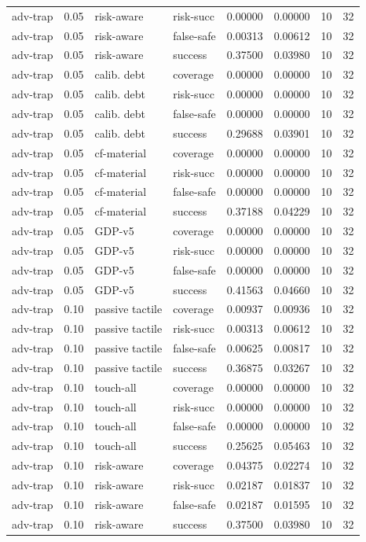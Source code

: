 \documentclass{article}
\begin{document}
\begin{center}
\begin{longtable}{llllllll}
adv-trap & 0.05 & risk-aware & risk-succ & 0.00000 & 0.00000 & 10 & 32 \\
adv-trap & 0.05 & risk-aware & false-safe & 0.00313 & 0.00612 & 10 & 32 \\
adv-trap & 0.05 & risk-aware & success & 0.37500 & 0.03980 & 10 & 32 \\
adv-trap & 0.05 & calib. debt & coverage & 0.00000 & 0.00000 & 10 & 32 \\
adv-trap & 0.05 & calib. debt & risk-succ & 0.00000 & 0.00000 & 10 & 32 \\
adv-trap & 0.05 & calib. debt & false-safe & 0.00000 & 0.00000 & 10 & 32 \\
adv-trap & 0.05 & calib. debt & success & 0.29688 & 0.03901 & 10 & 32 \\
adv-trap & 0.05 & cf-material & coverage & 0.00000 & 0.00000 & 10 & 32 \\
adv-trap & 0.05 & cf-material & risk-succ & 0.00000 & 0.00000 & 10 & 32 \\
adv-trap & 0.05 & cf-material & false-safe & 0.00000 & 0.00000 & 10 & 32 \\
adv-trap & 0.05 & cf-material & success & 0.37188 & 0.04229 & 10 & 32 \\
adv-trap & 0.05 & GDP-v5 & coverage & 0.00000 & 0.00000 & 10 & 32 \\
adv-trap & 0.05 & GDP-v5 & risk-succ & 0.00000 & 0.00000 & 10 & 32 \\
adv-trap & 0.05 & GDP-v5 & false-safe & 0.00000 & 0.00000 & 10 & 32 \\
adv-trap & 0.05 & GDP-v5 & success & 0.41563 & 0.04660 & 10 & 32 \\
adv-trap & 0.10 & passive tactile & coverage & 0.00937 & 0.00936 & 10 & 32 \\
adv-trap & 0.10 & passive tactile & risk-succ & 0.00313 & 0.00612 & 10 & 32 \\
adv-trap & 0.10 & passive tactile & false-safe & 0.00625 & 0.00817 & 10 & 32 \\
adv-trap & 0.10 & passive tactile & success & 0.36875 & 0.03267 & 10 & 32 \\
adv-trap & 0.10 & touch-all & coverage & 0.00000 & 0.00000 & 10 & 32 \\
adv-trap & 0.10 & touch-all & risk-succ & 0.00000 & 0.00000 & 10 & 32 \\
adv-trap & 0.10 & touch-all & false-safe & 0.00000 & 0.00000 & 10 & 32 \\
adv-trap & 0.10 & touch-all & success & 0.25625 & 0.05463 & 10 & 32 \\
adv-trap & 0.10 & risk-aware & coverage & 0.04375 & 0.02274 & 10 & 32 \\
adv-trap & 0.10 & risk-aware & risk-succ & 0.02187 & 0.01837 & 10 & 32 \\
adv-trap & 0.10 & risk-aware & false-safe & 0.02187 & 0.01595 & 10 & 32 \\
adv-trap & 0.10 & risk-aware & success & 0.37500 & 0.03980 & 10 & 32 \\
\bottomrule
\end{longtable}
\renewcommand{\arraystretch}{1.0}
\end{center}
\end{document}
